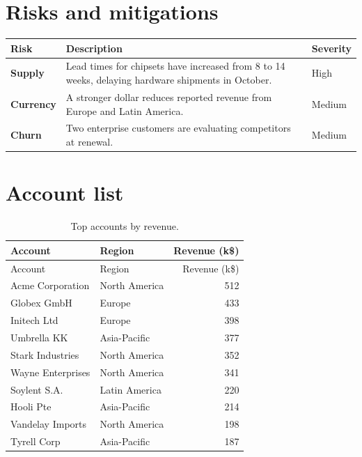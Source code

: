 \documentclass[11pt,a4paper]{article}
\begin{document}
\section{Risks and mitigations}

\noindent
\begin{tabularx}{\textwidth}{>{\bfseries}l X >{\centering\arraybackslash}p{2cm}}
\toprule
Risk & Description & Severity \\
\midrule
Supply & Lead times for chipsets have increased from 8 to 14 weeks, delaying
hardware shipments in October. & High \\
Currency & A stronger dollar reduces reported revenue from Europe and Latin America. & Medium \\
Churn & Two enterprise customers are evaluating competitors at renewal. & Medium \\
\bottomrule
\end{tabularx}

\section{Account list}

\begin{longtable}{p{4cm} l r}
\caption{Top accounts by revenue.}\\
\toprule
Account & Region & Revenue (k\$) \\
\midrule
\endfirsthead
\toprule
Account & Region & Revenue (k\$) \\
\midrule
\endhead
\bottomrule
\endfoot
Acme Corporation & North America & 512 \\
Globex GmbH & Europe & 433 \\
Initech Ltd & Europe & 398 \\
Umbrella KK & Asia-Pacific & 377 \\
Stark Industries & North America & 352 \\
Wayne Enterprises & North America & 341 \\
Soylent S.A. & Latin America & 220 \\
Hooli Pte & Asia-Pacific & 214 \\
Vandelay Imports & North America & 198 \\
Tyrell Corp & Asia-Pacific & 187 \\
\end{longtable}
\end{document}
